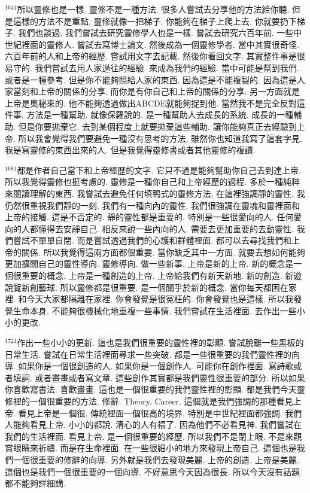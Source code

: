 \documentclass{book}
\begin{document}
$^{1641}$所以靈修也是一樣.
靈修不是一種方法.
很多人嘗試去分享他的方法給你聽.
但是這樣的方法不是重點.
靈修就像一把梯子.
你能夠在梯子上爬上去.
你就要扔下梯子.
我們也談過.
我們嘗試去研究靈修學人也是一樣.
嘗試去研究六百年前.
一些中世紀裡面的靈修人.
嘗試去寫博士論文.
然後成為一個靈修學者.
當中其實很奇怪.
六百年前的人和上帝的經歷.
嘗試用文字去記載.
然後你看回文字.
其實整件事是很易守的.
我們嘗試去用人家過往的經驗.
來成為我們的經驗.
當中可能是幫到我們.
或者是一種參考.
但是你不能夠照給人家的東西.
因為這是不能複製的.
因為這是人家當刻和上帝的關係的分享.
而你是有你自己和上帝的關係的分享.
另一方面就是上帝是奧秘來的.
他不能夠透過做出ABCDE就能夠捉到他.
當然我不是完全反對這件事.
方法是一種幫助.
就像保羅說的.
是一種幫助人去成長的系統.
成長的一種輔助.
但是你要拋棄它.
去到某個程度上就要拋棄這些輔助.
讓你能夠真正去經驗到上帝.
所以我會覺得我們要避免一種沒有思考的方法.
雖然你也知道我寫了這套字見.
我是寫靈修的東西出來的人.
但是我覺得靈修書或者其他靈修的複讀.

$^{1681}$都是作者自己當下和上帝經歷的文字.
它只不過是能夠幫助你自己去到達上帝.
所以我覺得靈修也挺考慮的.
靈修是一種你自己和上帝經歷的過程.
多於一種純粹來閱讀理解的東西.
我嘗試去避免任何填鴨式的靈修方法.
在這裡強調靜的靈性.
我仍然很重視我們靜的一刻.
我們有一種向內的靈性.
我們很強調在靈魂和靈裡面和上帝的接觸.
這是不否定的.
靜的靈性都是重要的.
特別是一些很愛向的人.
任何愛向的人都懂得去安靜自己.
相反來說一些內向的人.
需要去更加重要的去動靈性.
我們嘗試不單單自閉.
而是嘗試透過我們的心護和群體裡面.
都可以去尋找我們和上帝的關係.
所以我覺得這兩方面都很重要.
當你缺乏其中一方面.
就要去想如何能夠更加擴闊自己的靈性導向.
靈修導向.
做一些新事.
上帝是新的上帝.
新的概念是一個很重要的概念.
上帝是一種創造的上帝.
上帝給我們有新天新地.
新的創造.
新遊說覽新創藝球.
所以靈修都是很重要.
是一個關乎於新的概念.
當你每天都困在家裡.
和今天大家都隔離在家裡.
你會發覺是很冤枉的.
你會發覺也是這樣.
所以我發覺生命本身.
不能夠很機械化地重複一些事情.
我們嘗試在生活裡面.
去作出一些小小的更改.

$^{1721}$作出一些小小的更新.
這也是我們很重要的靈性裡的彰顯.
嘗試脫離一些黑板的日常生活.
嘗試在日常生活裡面尋求一些突破.
都是一些很重要的我們靈性裡的向導.
如果你是一個很創造的人.
如果你是一個創作人.
可能你在創作裡面.
寫詩歌或者填詞.
或者畫畫或者寫文章.
這些創作其實都是我們靈性很重要的部分.
所以如果你喜歡寫書法.
喜歡畫畫.
這也是一個很重要的我們靈性裡的彰顯.
都是我們今天靈修裡的一個很重要的方法.
修辭.
Theory.
Career.
這個就是我們強調的那種看見上帝.
看見上帝是一個很.
傳統裡面一個很高的境界.
特別是中世紀裡面都強調.
我們人能夠看見上帝.
小小的都說.
清心的人有福了.
因為他們不必看見神.
我們嘗試在我們的生活裡面.
看見上帝.
是一個很重要的經歷.
所以我們不是閉上眼.
不是來觀賞眼睛來祈禱.
而是在生命裡面.
在一些很細小的地方來發現上帝自己.
這個也是我們一個很重要的修辭的向導.
另外就是我們去發現美麗.
上帝的創造.
上帝是美麗.
這個也是我們一個很重要的一個向導.
不好意思今天因為很長.
所以今天沒有話題都不能夠詳細講.
\end{document}
